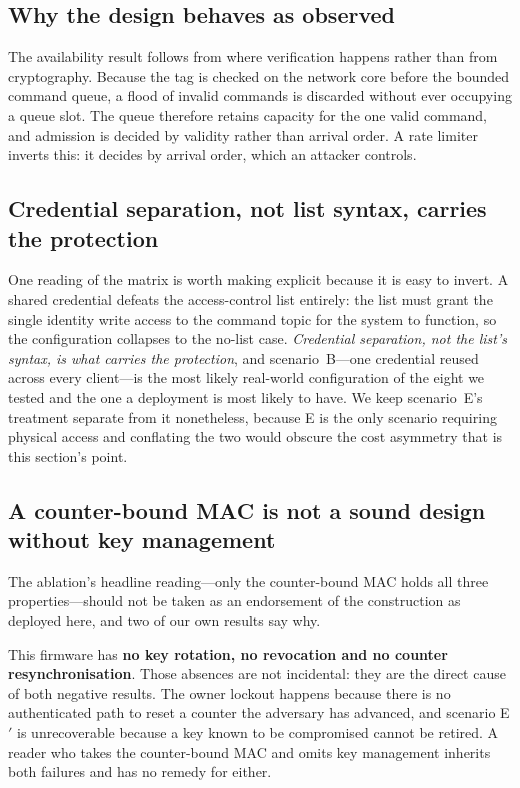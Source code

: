 \subsection{Why the design behaves as observed}

The availability result follows from where verification happens rather than from cryptography.
Because the tag is checked on the network core before the bounded command queue, a flood of
invalid commands is discarded without ever occupying a queue slot. The queue therefore retains
capacity for the one valid command, and admission is decided by validity rather than arrival
order. A rate limiter inverts this: it decides by arrival order, which an attacker controls.

\subsection{Credential separation, not list syntax, carries the protection}

One reading of the matrix is worth making explicit because it is easy to invert. A shared
credential defeats the access-control list entirely: the list must grant the single identity write
access to the command topic for the system to function, so the configuration collapses to the
no-list case. \emph{Credential separation, not the list's syntax, is what carries the protection},
and scenario~B---one credential reused across every client---is the most likely real-world
configuration of the eight we tested and the one a deployment is most likely to have. We keep
scenario~E's treatment separate from it nonetheless, because E is the only scenario requiring
physical access and conflating the two would obscure the cost asymmetry that is this section's
point.

\subsection{A counter-bound MAC is not a sound design without key management}

The ablation's headline reading---only the counter-bound MAC holds all three
properties---should not be taken as an endorsement of the construction as deployed here, and two of
our own results say why.

This firmware has \textbf{no key rotation, no revocation and no counter resynchronisation}. Those
absences are not incidental: they are the direct cause of both negative results. The owner lockout
happens because there is no authenticated path to reset a counter the adversary has advanced, and
scenario E$'$ is unrecoverable because a key known to be compromised cannot be retired. A reader who
takes the counter-bound MAC and omits key management inherits both failures and has no remedy for
either.

